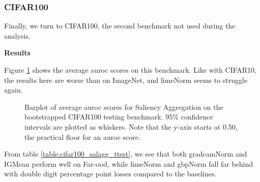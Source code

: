 \documentclass[UKenglish]{uiomasterthesis} %
\theoremstyle{definition}
\begin{document}
\subsubsection{CIFAR100}

Finally, we turn to CIFAR100, the second benchmark not used during the analysis. 

\noindent \textbf{Results}

\noindent Figure \ref{fig:cifar100_salagg_bootstrap_barplot} shows the average \ac{auroc} scores on this benchmark. Like with CIFAR10, the results here are worse than on ImageNet, and \ac{lime}Norm seems to struggle again.

\begin{figure}[H]
    \begin{center}
        
    \end{center}
    \caption[CIFAR100 Saliency Aggregation Bootstrap]{Barplot of average \ac{auroc} scores for Saliency Aggregation on the bootstrapped CIFAR100 testing benchmark. 95\% confidence intervals are plotted as whiskers. Note that the y-axis starts at 0.50, the practical floor for an \ac{auroc} score.}
    \label{fig:cifar100_salagg_bootstrap_barplot}
\end{figure}

From table \ref{table:cifar100_salagg_ttest}, we see that both \ac{gradcam}Norm and IGMean perform well on Far-\ac{ood}, while \ac{lime}Norm and \ac{gbp}Norm fall far behind with double digit percentage point losses compared to the baselines.
\end{document}
